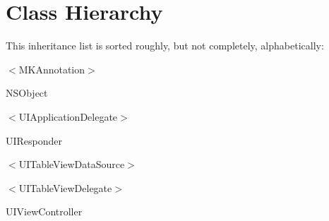 \section{Class Hierarchy}
This inheritance list is sorted roughly, but not completely, alphabetically\+:\begin{DoxyCompactList}
\item $<$M\+K\+Annotation$>$\begin{DoxyCompactList}
\item {}
\end{DoxyCompactList}
\item N\+S\+Object\begin{DoxyCompactList}
\item {}
\end{DoxyCompactList}
\item $<$U\+I\+Application\+Delegate$>$\begin{DoxyCompactList}
\item {}
\end{DoxyCompactList}
\item U\+I\+Responder\begin{DoxyCompactList}
\item {}
\end{DoxyCompactList}
\item $<$U\+I\+Table\+View\+Data\+Source$>$\begin{DoxyCompactList}
\item {}
\end{DoxyCompactList}
\item $<$U\+I\+Table\+View\+Delegate$>$\begin{DoxyCompactList}
\item {}
\end{DoxyCompactList}
\item U\+I\+View\+Controller\begin{DoxyCompactList}
\item {}
\item {}
\item {}
\end{DoxyCompactList}
\end{DoxyCompactList}
